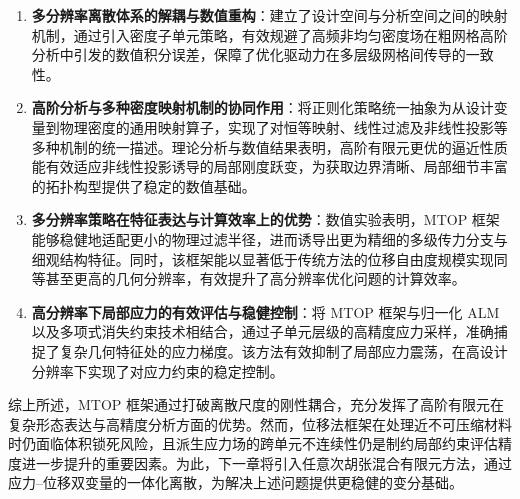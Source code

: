 \begin{enumerate}
	\item \textbf{多分辨率离散体系的解耦与数值重构}：建立了设计空间与分析空间之间的映射机制，通过引入密度子单元策略，有效规避了高频非均匀密度场在粗网格高阶分析中引发的数值积分误差，保障了优化驱动力在多层级网格间传导的一致性。
	
	\item \textbf{高阶分析与多种密度映射机制的协同作用}：将正则化策略统一抽象为从设计变量到物理密度的通用映射算子，实现了对恒等映射、线性过滤及非线性投影等多种机制的统一描述。理论分析与数值结果表明，高阶有限元更优的逼近性质能有效适应非线性投影诱导的局部刚度跃变，为获取边界清晰、局部细节丰富的拓扑构型提供了稳定的数值基础。
	
	\item \textbf{多分辨率策略在特征表达与计算效率上的优势}：数值实验表明，MTOP 框架能够稳健地适配更小的物理过滤半径，进而诱导出更为精细的多级传力分支与细观结构特征。同时，该框架能以显著低于传统方法的位移自由度规模实现同等甚至更高的几何分辨率，有效提升了高分辨率优化问题的计算效率。
	
	\item \textbf{高分辨率下局部应力的有效评估与稳健控制}：将 MTOP 框架与归一化 ALM 以及多项式消失约束技术相结合，通过子单元层级的高精度应力采样，准确捕捉了复杂几何特征处的应力梯度。该方法有效抑制了局部应力震荡，在高设计分辨率下实现了对应力约束的稳定控制。
\end{enumerate}

综上所述，MTOP 框架通过打破离散尺度的刚性耦合，充分发挥了高阶有限元在复杂形态表达与高精度分析方面的优势。然而，位移法框架在处理近不可压缩材料时仍面临体积锁死风险，且派生应力场的跨单元不连续性仍是制约局部约束评估精度进一步提升的重要因素。为此，下一章将引入任意次胡张混合有限元方法，通过应力--位移双变量的一体化离散，为解决上述问题提供更稳健的变分基础。


\fi